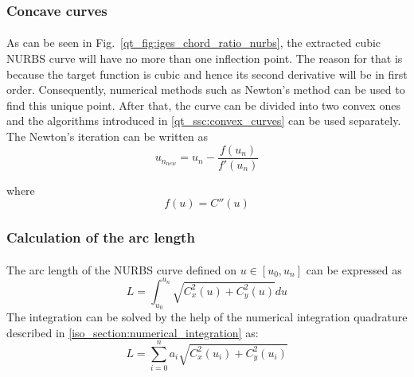 \subsubsection{Concave curves}
\paragraph{}
As can be seen in Fig.~\ref{qt_fig:iges_chord_ratio_nurbs}, the extracted cubic NURBS curve will have no more than one inflection point.
The reason for that is because the target function is cubic and hence its second derivative will be in first order.
Consequently, numerical methods such as Newton's method can be used to find this unique point.
After that, the curve can be divided into two convex ones and the algorithms introduced in \ref{qt_ssc:convex_curves} can be used separately.
The Newton's iteration can be written as
    \begin{equation}
        u_{n_{new}} = u_n - \frac{f(u_n)}{f'(u_n)}
    \end{equation}

where
    \begin{equation}
        f(u) = C''(u)
    \end{equation}
%
\subsubsection{Calculation of the arc length}
\paragraph{}
The arc length of the NURBS curve defined on $u \in [u_0, u_n]$ can be expressed as
    \begin{equation}
        L = \int_{u_0} ^{u_n} \sqrt{C_x^2(u) + C_y^2(u)} du
    \end{equation}
%
The integration can be solved by the help of the numerical integration quadrature described in \ref{iso_section:numerical_integration} as:
    \begin{equation}
        L = \sum_{i=0}^n a_i \sqrt{C_x^2(u_i) + C_y^2(u_i)}
    \end{equation}
